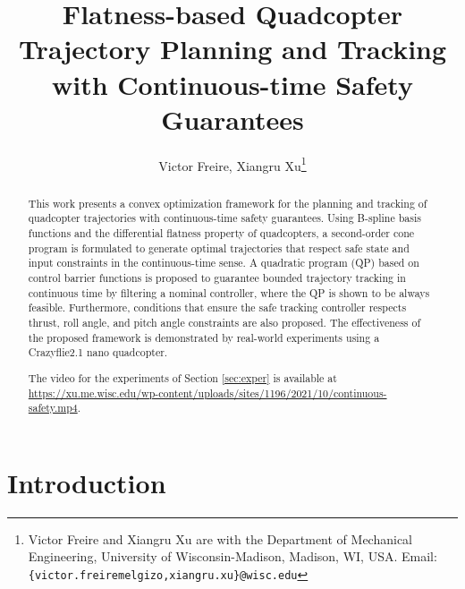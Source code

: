 \documentclass[journal,10pt]{IEEEtran}
\title{Flatness-based Quadcopter Trajectory Planning and Tracking with Continuous-time Safety Guarantees}
\author{Victor Freire,  Xiangru Xu\thanks{Victor Freire and Xiangru Xu are with the Department of Mechanical Engineering, University of Wisconsin-Madison,
        Madison, WI, USA. Email: 
        {\tt\small \{victor.freiremelgizo,xiangru.xu\}@wisc.edu}}}
\newif\ifdraft
\newcommand{\XX}[1]{\ifdraft{\color{red}[{\bf XX}: #1]}\fi}
\newcommand{\VF}[1]{\ifdraft{\color{blue}[{\bf VF}: #1]}\fi}
\begin{document}
\maketitle

\begin{abstract}
This work presents a convex optimization framework for the planning and tracking of quadcopter trajectories with continuous-time safety guarantees. Using B-spline basis functions and the differential flatness property of quadcopters, a second-order cone program is formulated to generate optimal trajectories that respect safe state and input constraints in the continuous-time sense. A quadratic program (QP) based on control barrier functions is proposed to guarantee bounded trajectory tracking in continuous time by filtering a nominal controller, where the QP is shown to be always feasible. Furthermore, conditions that ensure the safe tracking controller respects thrust, roll angle, and pitch angle constraints are also proposed. The effectiveness of the proposed framework is demonstrated by real-world experiments using a Crazyflie2.1 nano quadcopter. 

The video for the experiments of Section \ref{sec:exper} is available at %
\url{https://xu.me.wisc.edu/wp-content/uploads/sites/1196/2021/10/continuous-safety.mp4}.

\end{abstract}

\section{Introduction}
\end{document}
